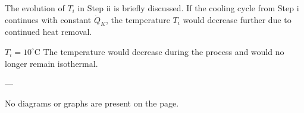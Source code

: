 The evolution of \( T_i \) in Step ii is briefly discussed. If the cooling cycle from Step i continues with constant \( \dot{Q}_K \), the temperature \( T_i \) would decrease further due to continued heat removal.

\( T_i = 10^\circ\text{C} \)  
The temperature would decrease during the process and would no longer remain isothermal.  

---

No diagrams or graphs are present on the page.